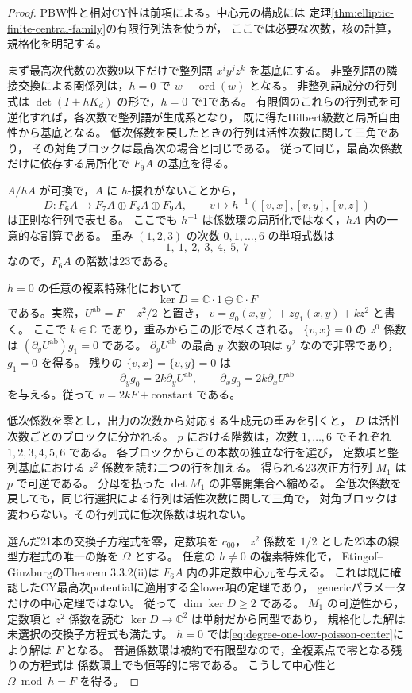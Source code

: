 \begin{proof}
PBW性と相対CY性は前項による。中心元の構成には
定理\ref{thm:elliptic-finite-central-family}の有限行列法を使うが，
ここでは必要な次数，核の計算，規格化を明記する。

まず最高次代数の次数9以下だけで整列語 $x^iy^jz^k$ を基底にする。
非整列語の隣接交換による関係列は，$h=0$ で
$w-\operatorname{ord}(w)$ となる。
非整列語成分の行列式は $\det(I+hK_d)$ の形で，$h=0$ で1である。
有限個のこれらの行列式を可逆化すれば，各次数で整列語が生成系となり，
既に得たHilbert級数と局所自由性から基底となる。
低次係数を戻したときの行列は活性次数に関して三角であり，
その対角ブロックは最高次の場合と同じである。
従って同じ，最高次係数だけに依存する局所化で $F_9A$ の基底を得る。

$A/hA$ が可換で，$A$ に $h$-捩れがないことから，
\[
 D:F_6A\longrightarrow F_7A\oplus F_8A\oplus F_9A,
 \qquad v\longmapsto h^{-1}([v,x],[v,y],[v,z])
\]
は正則な行列で表せる。
ここでも $h^{-1}$ は係数環の局所化ではなく，$hA$ 内の一意的な割算である。
重み $(1,2,3)$ の次数 $0,1,\ldots,6$ の単項式数は
\[
 1,\ 1,\ 2,\ 3,\ 4,\ 5,\ 7
\]
なので，$F_6A$ の階数は23である。

$h=0$ の任意の複素特殊化において
\begin{equation}\label{eq:degree-one-low-poisson-center}
 \ker D=\mathbb C\cdot1\oplus\mathbb C\cdot F
\end{equation}
である。実際，$U^{\mathrm{ab}}=F-z^2/2$ と置き，
$v=g_0(x,y)+zg_1(x,y)+kz^2$ と書く。
ここで $k\in\mathbb C$ であり，重みからこの形で尽くされる。
$\{v,x\}=0$ の $z^0$ 係数は
$ (\partial_yU^{\mathrm{ab}})g_1=0$ である。
$\partial_yU^{\mathrm{ab}}$ の最高 $y$ 次数の項は $y^2$ なので非零であり，
$g_1=0$ を得る。
残りの $\{v,x\}=\{v,y\}=0$ は
\[
 \partial_yg_0=2k\partial_yU^{\mathrm{ab}},\qquad
 \partial_xg_0=2k\partial_xU^{\mathrm{ab}}
\]
を与える。従って $v=2kF+\text{constant}$ である。

低次係数を零とし，出力の次数から対応する生成元の重みを引くと，
$D$ は活性次数ごとのブロックに分かれる。
$p$ における階数は，次数 $1,\ldots,6$ でそれぞれ
$1,2,3,4,5,6$ である。
各ブロックからこの本数の独立な行を選び，
定数項と整列基底における $z^2$ 係数を読む二つの行を加える。
得られる23次正方行列 $M_1$ は $p$ で可逆である。
分母を払った $\det M_1$ の非零開集合へ縮める。
全低次係数を戻しても，同じ行選択による行列は活性次数に関して三角で，
対角ブロックは変わらない。その行列式に低次係数は現れない。

選んだ21本の交換子方程式を零，定数項を $c_{00}$，
$z^2$ 係数を $1/2$ とした23本の線型方程式の唯一の解を $\Omega$ とする。
任意の $h\ne0$ の複素特殊化で，
Etingof--GinzburgのTheorem 3.3.2(ii)は $F_6A$ 内の非定数中心元を与える。
これは既に確認したCY最高次potentialに適用する全lower項の定理であり，
genericパラメータだけの中心定理ではない。
従って $\dim\ker D\ge2$ である。
$M_1$ の可逆性から，定数項と $z^2$ 係数を読む
$\ker D\to\mathbb C^2$ は単射だから同型であり，
規格化した解は未選択の交換子方程式も満たす。
$h=0$ では\eqref{eq:degree-one-low-poisson-center}により解は $F$ となる。
普遍係数環は被約で有限型なので，全複素点で零となる残りの方程式は
係数環上でも恒等的に零である。
こうして中心性と $\Omega\bmod h=F$ を得る。


\end{proof}
